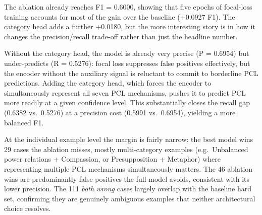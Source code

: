\documentclass{article}
\begin{document}
The ablation already reaches F1 = 0.6000, showing that five epochs of focal-loss training accounts for most of the gain over the baseline (+0.0927 F1). The category head adds a further +0.0180, but the more interesting story is in how it changes the precision/recall trade-off rather than just the headline number.

Without the category head, the model is already very precise (P = 0.6954) but under-predicts (R = 0.5276): focal loss suppresses false positives effectively, but the encoder without the auxiliary signal is reluctant to commit to borderline PCL predictions. Adding the category head, which forces the encoder to simultaneously represent all seven PCL mechanisms, pushes it to predict PCL more readily at a given confidence level. This substantially closes the recall gap (0.6382 vs.\ 0.5276) at a precision cost (0.5991 vs.\ 0.6954), yielding a more balanced F1.

At the individual example level the margin is fairly narrow: the best model wins 29 cases the ablation misses, mostly multi-category examples (e.g.\ Unbalanced power relations + Compassion, or Presupposition + Metaphor) where representing multiple PCL mechanisms simultaneously matters. The 46 ablation wins are predominantly false positives the full model avoids, consistent with its lower precision. The 111 \textit{both wrong} cases largely overlap with the baseline hard set, confirming they are genuinely ambiguous examples that neither architectural choice resolves.
\end{document}

